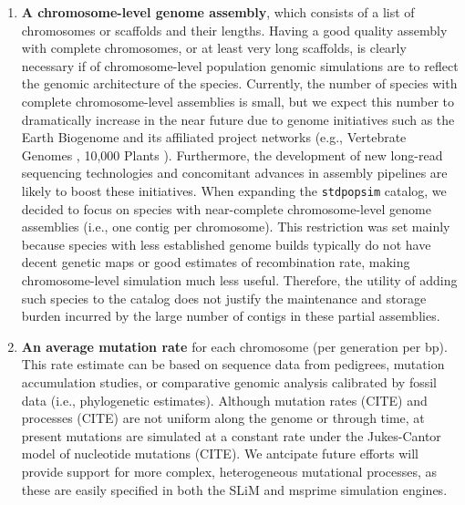 \documentclass[hidelinks]{article}
\newcommand{\stdpopsim}{\texttt{stdpopsim}\xspace}
\begin{document}
\begin{enumerate}
\def\labelenumi{\arabic{enumi}.}

\item
  \textbf{A chromosome-level genome assembly}, which consists of a list of chromosomes or scaffolds and their lengths. 
  Having a good quality assembly with complete chromosomes, or at least very long scaffolds, 
  is clearly necessary if of chromosome-level population genomic simulations are to reflect the genomic architecture of the species.
  Currently, the number of species with complete chromosome-level assemblies is small,
  but we expect this number to dramatically increase in the near future due to genome initiatives 
  such as the Earth Biogenome \citep{Lewin2022} and its affiliated project networks (e.g.,
  Vertebrate Genomes \citep{Rhie2021}, 10,000 Plants \citep{Cheng2018}).
  Furthermore, the development of new long-read sequencing technologies
  \citep{Amarasinghe2020} and concomitant advances in assembly pipelines
  \citep{Chakraborty2016} are likely to boost these initiatives. 
  When expanding the \stdpopsim catalog, we decided to focus on species with near-complete 
  chromosome-level genome assemblies (i.e., one contig per chromosome).
  This restriction was set mainly because species with less established genome builds 
  typically do not have decent genetic maps or good estimates of recombination rate, 
  making chromosome-level simulation much less useful. 
  Therefore, the utility of adding such species to the catalog does not justify the 
  maintenance and storage burden incurred by the large number of contigs in these partial assemblies.

\item
  \textbf{An average mutation rate} for each chromosome (per generation per bp).
  This rate estimate can be based on sequence data from pedigrees, mutation accumulation studies, 
  or comparative genomic analysis calibrated by fossil data (i.e., phylogenetic estimates).
  Although mutation rates (CITE) and processes (CITE) are not uniform along the genome or through time,
  at present mutations are simulated at a constant rate under the Jukes-Cantor model of nucleotide mutations (CITE).
  We antcipate future efforts will provide support for more complex, heterogeneous mutational processes,
  as these are easily specified in both the SLiM and msprime simulation engines.


\end{enumerate}
\end{document}
